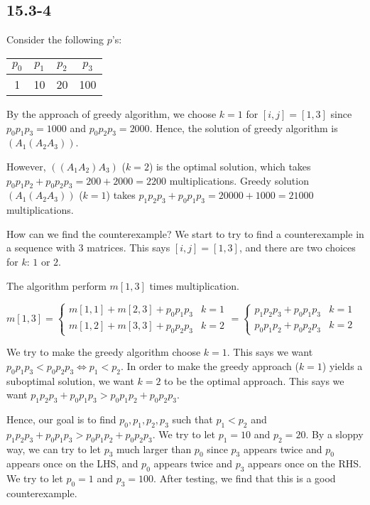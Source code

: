 \subsection*{15.3-4}

\noindent
Consider the following $p$'s:

\begin{tabular}{c|c|c|c}
    $p_0$ & $p_1$ & $p_2$ & $p_3$ \\
    \hline
    1 & 10 & 20 & 100
\end{tabular}

\noindent
By the approach of greedy algorithm,
we choose $k=1$ for $[i,j]=[1,3]$ since
$p_0p_1p_3=1000$ and $p_0p_2p_3=2000$.
Hence, the solution of greedy algorithm is $(A_1(A_2A_3))$.

\noindent
However, $((A_1A_2)A_3)$ ($k=2$) is the optimal solution,
which takes $p_0p_1p_2 + p_0p_2p_3 = 200 + 2000 = 2200$ multiplications.
Greedy solution $(A_1(A_2A_3))$ ($k=1$) takes 
$p_1p_2p_3 + p_0p_1p_3 = 20000 + 1000 = 21000$ multiplications.

\noindent
How can we find the counterexample?
We start to try to find a counterexample 
in a sequence with $3$ matrices.
This says $[i,j]=[1,3]$,
and there are two choices for $k$: $1$ or $2$.

\noindent
The algorithm perform $m[1,3]$ times multiplication.

$m[1,3]=
\begin{cases}
    m[1,1]+m[2,3]+p_0p_1p_3 & k=1 \\
    m[1,2]+m[3,3]+p_0p_2p_3 & k=2
\end{cases}
=
\begin{cases}
    p_1p_2p_3+p_0p_1p_3 & k=1 \\
    p_0p_1p_2+p_0p_2p_3 & k=2
\end{cases}$

\noindent
We try to make the greedy algorithm choose $k=1$.
This says we want $p_0p_1p_3<p_0p_2p_3 \Longleftrightarrow p_1<p_2$.
In order to make the greedy approach ($k=1$) yields a suboptimal solution,
we want $k=2$ to be the optimal approach.
This says we want $p_1p_2p_3+p_0p_1p_3 > p_0p_1p_2+p_0p_2p_3$.

\noindent
Hence, our goal is to find $p_0,p_1,p_2,p_3$ such that 
$p_1<p_2$ and $p_1p_2p_3+p_0p_1p_3 > p_0p_1p_2+p_0p_2p_3$.
We try to let $p_1 = 10$ and $p_2 = 20$.
By a sloppy way, we can try to let $p_3$ much larger than $p_0$
since $p_3$ appears twice and $p_0$ appears once on the LHS,
and $p_0$ appears twice and $p_3$ appears once on the RHS.
We try to let $p_0 = 1$ and $p_3 = 100$.
After testing, we find that this is a good counterexample.

